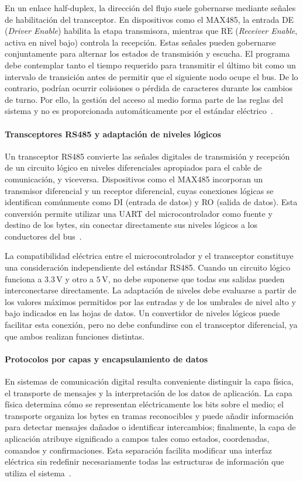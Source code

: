 En un enlace half-duplex, la dirección del flujo suele gobernarse mediante señales de habilitación del transceptor. En dispositivos como el MAX485, la entrada DE (\textit{Driver Enable}) habilita la etapa transmisora, mientras que $\overline{\mathrm{RE}}$ (\textit{Receiver Enable}, activa en nivel bajo) controla la recepción. Estas señales pueden gobernarse conjuntamente para alternar los estados de transmisión y escucha. El programa debe contemplar tanto el tiempo requerido para transmitir el último bit como un intervalo de transición antes de permitir que el siguiente nodo ocupe el bus. De lo contrario, podrían ocurrir colisiones o pérdida de caracteres durante los cambios de turno. Por ello, la gestión del acceso al medio forma parte de las reglas del sistema y no es proporcionada automáticamente por el estándar eléctrico~\cite{kugelstadt2021rs485}.

\paragraph{Transceptores RS485 y adaptación de niveles lógicos}
Un transceptor RS485 convierte las señales digitales de transmisión y recepción de un circuito lógico en niveles diferenciales apropiados para el cable de comunicación, y viceversa. Dispositivos como el MAX485 incorporan un transmisor diferencial y un receptor diferencial, cuyas conexiones lógicas se identifican comúnmente como DI (entrada de datos) y RO (salida de datos). Esta conversión permite utilizar una UART del microcontrolador como fuente y destino de los bytes, sin conectar directamente sus niveles lógicos a los conductores del bus~\cite{kugelstadt2021rs485}.

La compatibilidad eléctrica entre el microcontrolador y el transceptor constituye una consideración independiente del estándar RS485. Cuando un circuito lógico funciona a $3.3\,\mathrm{V}$ y otro a $5\,\mathrm{V}$, no debe suponerse que todas sus salidas pueden interconectarse directamente. La adaptación de niveles debe evaluarse a partir de los valores máximos permitidos por las entradas y de los umbrales de nivel alto y bajo indicados en las hojas de datos. Un convertidor de niveles lógicos puede facilitar esta conexión, pero no debe confundirse con el transceptor diferencial, ya que ambos realizan funciones distintas.

\paragraph{Protocolos por capas y encapsulamiento de datos}
En sistemas de comunicación digital resulta conveniente distinguir la capa física, el transporte de mensajes y la interpretación de los datos de aplicación. La capa física determina cómo se representan eléctricamente los bits sobre el medio; el transporte organiza los bytes en tramas reconocibles y puede añadir información para detectar mensajes dañados o identificar intercambios; finalmente, la capa de aplicación atribuye significado a campos tales como estados, coordenadas, comandos y confirmaciones. Esta separación facilita modificar una interfaz eléctrica sin redefinir necesariamente todas las estructuras de información que utiliza el sistema~\cite{kugelstadt2021rs485,pena2020uart}.

